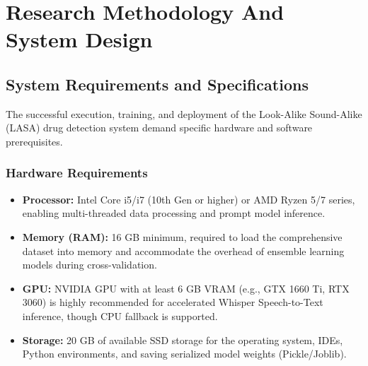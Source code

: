 \documentclass[12pt,a4paper]{report}
\begin{document}
\chapter{Research Methodology And System Design}

\section{System Requirements and Specifications}
The successful execution, training, and deployment of the Look-Alike Sound-Alike (LASA) drug detection system demand specific hardware and software prerequisites. 

\subsection{Hardware Requirements}
\begin{itemize}
    \item \textbf{Processor:} Intel Core i5/i7 (10th Gen or higher) or AMD Ryzen 5/7 series, enabling multi-threaded data processing and prompt model inference.
    \item \textbf{Memory (RAM):} 16 GB minimum, required to load the comprehensive dataset into memory and accommodate the overhead of ensemble learning models during cross-validation.
    \item \textbf{GPU:} NVIDIA GPU with at least 6 GB VRAM (e.g., GTX 1660 Ti, RTX 3060) is highly recommended for accelerated Whisper Speech-to-Text inference, though CPU fallback is supported.
    \item \textbf{Storage:} 20 GB of available SSD storage for the operating system, IDEs, Python environments, and saving serialized model weights (Pickle/Joblib).
\end{itemize}
\end{document}
